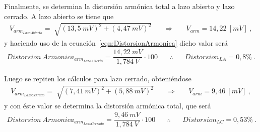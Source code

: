       Finalmente, se determina la distorsión armónica total a lazo abierto y lazo 
      cerrado. A lazo abierto se tiene que 
      \begin{align*}
        V_{arm_{Lazo Abierto}}=\sqrt[]{(13,5~mV)^2+(4,47~mV)^2} \hspace{20pt} \Longrightarrow \hspace{20pt} V_{arm}=14,22~[mV]~,
      \end{align*}
      y haciendo uso de la ecuación~\ref{eqn:DistorsionArmonica} dicho valor será
      \begin{align*}
        Distorsion~Armonica_{arm_{Lazo Abierto}}= \dfrac{14,22~mV}{1,784~V} \cdot 100 \hspace{20pt} \therefore \hspace{20pt} \boxed{Distorsion_{LA}=0,8\%}~.
      \end{align*}

      Luego se repiten los cálculos para lazo cerrado, obteniéndose 
      \begin{align*}
        V_{arm_{Lazo Cerrado}}=\sqrt[]{(7,41~mV)^2+(5,88~mV)^2} \hspace{20pt} \Longrightarrow \hspace{20pt} V_{arm}=9,46~[mV]~,
      \end{align*}
      y con éste valor se determina la distorsión armónica total, que será 
      \begin{align*}
        Distorsion~Armonica_{arm_{Lazo Cerrado}}= \dfrac{9,46~mV}{1,784~V} \cdot 100 \hspace{20pt} \therefore \hspace{20pt} \boxed{Distorsion_{LC}=0,53\%}~.
      \end{align*}
